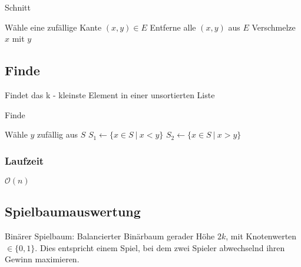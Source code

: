 \begin{algorithm}[H]
	\caption{Schnitt}

	\BlankLine
	
	 {
		Wähle eine zufällige Kante $(x,y) \in E$\newline
		Entferne alle $(x,y)$ aus $E$\newline
		Verschmelze $x$ mit $y$
	}
	\BlankLine

\end{algorithm}


\subsection{Finde}
Findet das k - kleinste Element in einer unsortierten Liste
\begin{algorithm}[H]
	\caption{Finde}

	\BlankLine
	
	Wähle $y$ zufällig aus $S$\newline
	$S_1 \longleftarrow \{x \in S~|~x < y \} $\newline
	$S_2 \longleftarrow \{x \in S~|~x > y \} $
	\BlankLine

\end{algorithm}

\subsubsection{Laufzeit}
\(\mathcal{O}(n)\)

\subsection{Spielbaumauswertung}
Binärer Spielbaum: Balancierter Binärbaum gerader Höhe \(2k\), mit Knotenwerten \(\in \{0,1\}\). Dies entspricht einem Spiel, bei dem zwei Spieler abwechselnd ihren Gewinn maximieren.

